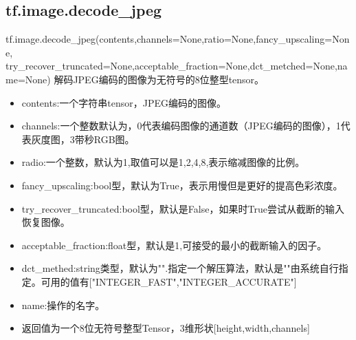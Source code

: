 {\subsection{tf.image.decode\_jpeg}
tf.image.decode\_jpeg(contents,channels=None,ratio=None,fancy\_upscaling=None,\newline
try\_recover\_truncated=None,acceptable\_fraction=None,dct\_metched=None,name=None)
解码JPEG编码的图像为无符号的8位整型tensor。\newline
\begin{itemize}
	\item contents:一个字符串tensor，JPEG编码的图像。
	\item channels:一个整数默认为，0代表编码图像的通道数（JPEG编码的图像），1代表灰度图，3带秒RGB图。
	\item radio:一个整数，默认为1,取值可以是1,2,4,8,表示缩减图像的比例。
	\item fancy\_upscaling:bool型，默认为True，表示用慢但是更好的提高色彩浓度。
	\item try\_recover\_truncated:bool型，默认是False，如果时True尝试从截断的输入恢复图像。
	\item acceptable\_fraction:float型，默认是1,可接受的最小的截断输入的因子。
	\item dct\_methed:string类型，默认为"".指定一个解压算法，默认是""由系统自行指定。可用的值有["INTEGER\_FAST","INTEGER\_ACCURATE"]
	\item name:操作的名字。
	\item 返回值为一个8位无符号整型Tensor，3维形状[height,width,channels]
\end{itemize}
}
